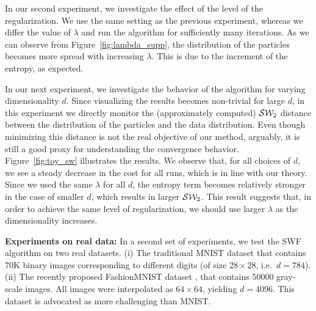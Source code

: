 In our second experiment, we investigate the effect of the level of the regularization. We use the same setting as the previous experiment, whereas we differ the value of $\lambda$ and run the algorithm for sufficiently many iterations. As we can observe from Figure~\ref{fig:lambda_supp}, the distribution of the particles becomes more spread with increasing $\lambda$. This is due to the increment of the entropy, as expected.



In our next experiment, we investigate the behavior of the algorithm for varying dimensionality $d$. Since visualizing the results becomes non-trivial for large $d$, in this experiment we directly monitor the (approximately computed) ${\cal S}{\cal W}_2$ distance between the distribution of the particles and the data distribution. Even though minimizing this distance is not the real objective of our method, arguably, it is still a good proxy for understanding the convergence behavior. 
%
Figure~\ref{fig:toy_sw} illustrates the results. We observe that, for all choices of $d$, we see a steady decrease in the cost for all runs, which is in line with our theory. Since we used the same $\lambda$ for all $d$, the entropy term becomes relatively stronger in the case of smaller $d$, which results in larger ${\cal S}{\cal W}_2$. This result suggests that, in order to achieve the same level of regularization, we should use larger $\lambda$ as the dimensionality increases. 












\textbf{Experiments on real data: }
%
In a second set of experiments, we test the SWF algorithm on two real datasets. (i) The traditional MNIST dataset that contains 70K binary images corresponding to different digits (of size $28 \times 28$, i.e.\ $d = 784$). (ii) The recently proposed FashionMNIST dataset \cite{xiao2017fashion}, that contains $50000$ gray-scale images. All images were interpolated as $64\times 64$, yielding $d=4096$. This dataset is advocated as more challenging than MNIST. 


